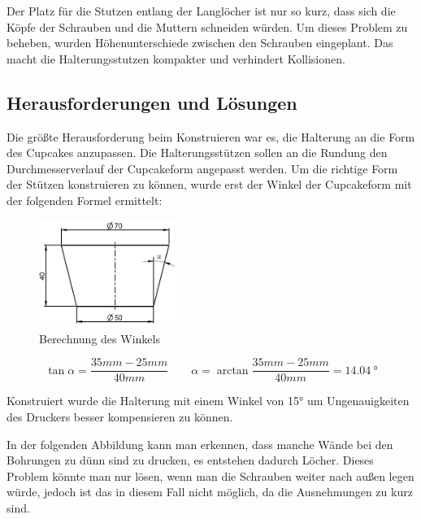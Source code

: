 	Der Platz für die Stutzen entlang der Langlöcher ist nur so kurz, dass sich die Köpfe der Schrauben und die Muttern schneiden würden.
	Um dieses Problem zu beheben, wurden Höhenunterschiede zwischen den Schrauben eingeplant.
	Das macht die Halterungsstutzen kompakter und verhindert Kollisionen.

	\subsection{Herausforderungen und Lösungen}

	Die größte Herausforderung beim Konstruieren war es, die Halterung an die Form des Cupcakes anzupassen.
	Die Halterungsstützen sollen an die Rundung \bzw den Durchmesserverlauf der Cupcakeform angepasst werden.
	Um die richtige Form der Stützen konstruieren zu können, wurde erst der Winkel der Cupcakeform mit der  folgenden Formel ermittelt:

			\begin{figure}[tbh]
			\begin{centering}
			\includegraphics[width = 0.4\textwidth]{Bilder/berechnung_winkel}
			\par\end{centering}
			\caption{Berechnung des Winkels}
			\label{berechnung_winkel}
			\end{figure}

			\[
 				\tan \alpha = \frac{35mm-25mm}{40mm}  \qquad \alpha = \arctan \frac{35mm-25mm}{40mm} = \SI{14.04}{\degree}
 			\]

	Konstruiert wurde die Halterung mit einem Winkel von 15° um Ungenauigkeiten des Druckers besser kompensieren zu können.

	In der folgenden Abbildung kann man erkennen, dass manche Wände bei den Bohrungen zu dünn sind zu drucken, es entstehen dadurch Löcher.
	Dieses Problem könnte man nur lösen, wenn man die Schrauben weiter nach außen legen würde, jedoch ist das in diesem Fall nicht möglich, da die Ausnehmungen zu kurz sind.


